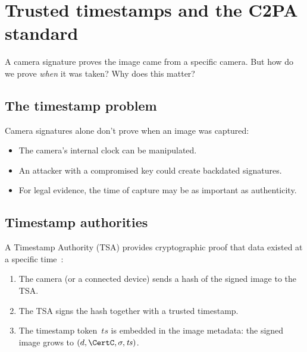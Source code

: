 \section{Trusted timestamps and the C2PA standard}\label{CameraTimestamps}


\begin{exercise}
  A camera signature proves the image came from a specific camera.
  But how do we prove \emph{when} it was taken?
  Why does this matter?
\end{exercise}

\subsection{The timestamp problem}

Camera signatures alone don't prove when an image was captured:
\begin{itemize}
  \item The camera's internal clock can be manipulated.
  \item An attacker with a compromised key could create backdated signatures.
  \item For legal evidence, the time of capture may be as important as 
    authenticity.
\end{itemize}

\subsection{Timestamp authorities}

A Timestamp Authority (TSA) provides cryptographic proof that data existed
at a specific time~\autocite{HaberStornetta1991,RFC3161}:
\begin{enumerate}
  \item The camera (or a connected device) sends a hash of the signed image to
    the TSA\@.
  \item The TSA signs the hash together with a trusted timestamp.
  \item The timestamp token~\(\mathit{ts}\) is embedded in the image
    metadata: the signed image grows to \((d, \CertC, \sigma,
    \mathit{ts})\).
\end{enumerate}

